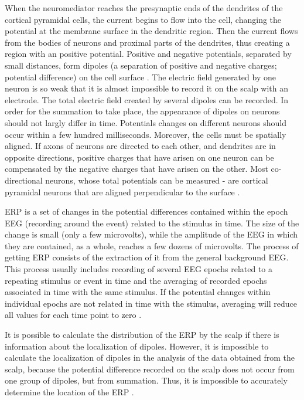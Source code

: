 \documentclass[14pt,a4paper]{scrartcl}
\begin{document}
When the neuromediator reaches the presynaptic ends of the dendrites of the cortical pyramidal cells, the current begins to flow into the cell, changing the potential at the membrane surface in the dendritic region. Then the current flows from the bodies of neurons and proximal parts of the dendrites, thus creating a region with an positive potential. Positive and negative potentials, separated by small distances, form dipoles (a separation of positive and negative charges; potential difference) on the cell surface \cite{Rugg1995}. The electric field generated by one neuron is so weak that it is almost impossible to record it on the scalp with an electrode. The total electric field created by several dipoles can be recorded. In order for the summation to take place, the appearance of dipoles on neurons should not largly differ in time. Potentials changes on different neurons should occur within a few hundred milliseconds. Moreover, the cells must be spatially aligned. If axons of neurons are directed to each other, and dendrites are in opposite directions, positive charges that have arisen on one neuron can be compensated by the negative charges that have arisen on the other. Most co-directional neurons, whose total potentials can be measured - are cortical pyramidal neurons that are aligned perpendicular to the surface \cite{Luck2005}. 

ERP is a set of changes in the potential differences contained within the epoch EEG (recording around the event) related to the stimulus in time. The size of the change is small (only a few microvolts), while the amplitude of the EEG in which they are contained, as a whole, reaches a few dozens of microvolts. The process of getting ERP consists of the extraction of it from the general background EEG. This process usually includes recording of several EEG epochs related to a repeating stimulus or event in time and the averaging of recorded epochs associated in time with the same stimulus. If the potential changes within individual epochs are not related in time with the stimulus, averaging will reduce all values for each time point to zero \cite{Luck2005}. 

It is possible to calculate the distribution of the ERP by the scalp if there is information about the localization of dipoles. However, it is impossible to calculate the localization of dipoles in the analysis of the data obtained from the scalp, because the potential difference recorded on the scalp does not occur from one group of dipoles, but from summation. Thus, it is impossible to accurately determine the location of the ERP \cite{Rugg1995}. 
\end{document}
